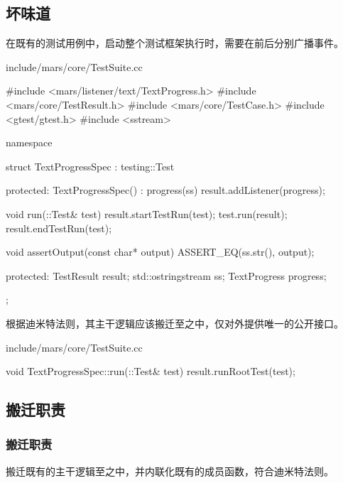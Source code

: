\begin{content}

\subsection{坏味道}

在既有的测试用例中，启动整个测试框架执行时，需要在前后分别广播事件。

\begin{nodiff}{include/mars/core/TestSuite.cc}
 \begin{c++}
#include <mars/listener/text/TextProgress.h>
#include <mars/core/TestResult.h>
#include <mars/core/TestCase.h>
#include <gtest/gtest.h>
#include <sstream>

namespace {
  struct TextProgressSpec : testing::Test {
  protected:
    TextProgressSpec() : progress(ss) {
      result.addListener(progress);
    }

    void run(::Test& test) {
      result.startTestRun(test);
      test.run(result);
      result.endTestRun(test);
    }

    void assertOutput(const char* output) {
      ASSERT_EQ(ss.str(), output);
    }

  protected:
    TestResult result;
    std::ostringstream ss;
    TextProgress progress;
  };
}
 \end{c++}
\end{nodiff}

根据迪米特法则，其主干逻辑应该搬迁至之中，仅对外提供唯一的公开接口。

\begin{nodiff}{include/mars/core/TestSuite.cc}
 \begin{c++}
void TextProgressSpec::run(::Test& test) {
  result.runRootTest(test);   
}
 \end{c++}
\end{nodiff}

\subsection{搬迁职责}

\subsubsection{搬迁职责}

搬迁既有的主干逻辑至之中，并内联化既有的成员函数，符合迪米特法则。


\end{content}
